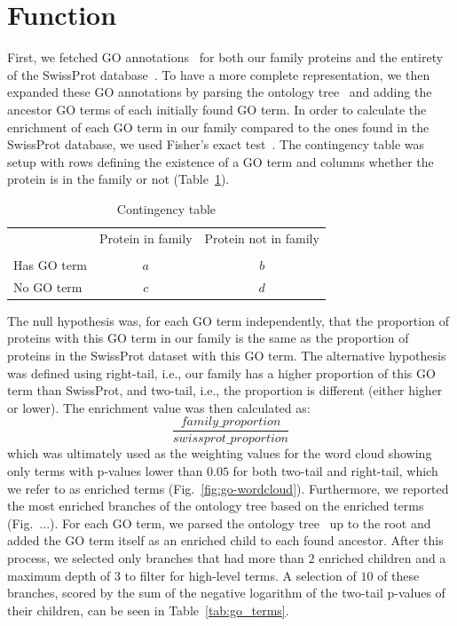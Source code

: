 
\section{Function}

First, we fetched GO annotations~\cite{gene_ontology} for both our family proteins and the entirety of the SwissProt database~\cite{swissprot}. To have a more complete representation, we then expanded these GO annotations by parsing the ontology tree~\cite{obo_parser} and adding the ancestor GO terms of each initially found GO term. In order to calculate the enrichment of each GO term in our family compared to the ones found in the SwissProt database, we used Fisher's exact test~\cite{fisher_test}. The contingency table was setup with rows defining the existence of a GO term and columns whether the protein is in the family or not (Table~\ref{tab:contingency}). 
\begin{table}[H]
    \centering
    \small
    \begin{tabular}{lccc}
        \toprule
         & Protein in family & \multicolumn{2}{c}{Protein not in family} \\
        \\
        \midrule
        Has GO term & $a$ & \multicolumn{2}{c}{$b$} \\
        No GO term & $c$ & \multicolumn{2}{c}{$d$} \\
        \bottomrule
    \end{tabular}
    \caption{Contingency table}
    \label{tab:contingency}
\end{table}
The null hypothesis was, for each GO term independently, that the proportion of proteins with this GO term in our family is the same as the proportion of proteins in the SwissProt dataset with this GO term. The alternative hypothesis was defined using right-tail, i.e., our family has a higher proportion of this GO term than SwissProt, and two-tail, i.e., the proportion is different (either higher or lower). The enrichment value was then calculated as:
$$
\dfrac{family\_proportion}{swissprot\_proportion}
$$
which was ultimately used as the weighting values for the word cloud showing only terms with p-values lower than $0.05$ for both two-tail and right-tail, which we refer to as enriched terms (Fig.~\ref{fig:go-wordcloud}). Furthermore, we reported the most enriched branches of the ontology tree based on the enriched terms (Fig.~...). For each GO term, we parsed the ontology tree~\cite{obo_parser} up to the root and added the GO term itself as an enriched child to each found ancestor. After this process, we selected only branches that had more than $2$ enriched children and a maximum depth of $3$ to filter for high-level terms. A selection of $10$ of these branches, scored by the sum of the negative logarithm of the two-tail p-values of their children, can be seen in Table~\ref{tab:go_terms}.

